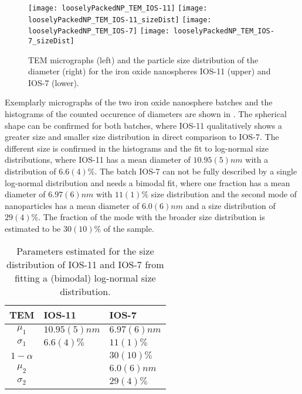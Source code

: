 \documentclass[\main/dresen_thesis.tex]{subfiles}
\begin{document}
  \label{sec:looselyPackedNS:nanoparticle:tem}
  \begin{figure}[!htbp]
    \centering
    \texttt{[image: looselyPackedNP\_TEM\_IOS-11]}
    \texttt{[image: looselyPackedNP\_TEM\_IOS-11\_sizeDist]}
    \texttt{[image: looselyPackedNP\_TEM\_IOS-7]}
    \texttt{[image: looselyPackedNP\_TEM\_IOS-7\_sizeDist]}
    \caption{\label{fig:looselyPackedNP:nanoparticle:tem}TEM micrographs (left) and the particle size distribution of the diameter (right) for the iron oxide nanospheres IOS-11 (upper) and IOS-7 (lower).}
  \end{figure}

  Exemplarly micrographs of the two iron oxide nanosphere batches and the histograms of the counted occurence of diameters are shown in .
  The spherical shape can be confirmed for both batches, where IOS-11 qualitatively shows a greater size and smaller size distribution in direct comparison to IOS-7.
  The different size is confirmed in the histograms and the fit to log-normal size distributions, where IOS-11 has a mean diameter of $10.95(5) \unit{nm}$ with a distribution of $6.6(4) \%$. 
  The batch IOS-7 can not be fully described by a single log-normal distribution and needs a bimodal fit, where one fraction has a mean diameter of $6.97(6) \unit{nm}$ with $11(1) \%$ size distribution and the second mode of nanoparticles has a mean diameter of $6.0(6) \unit{nm}$ and a size distribution of $29(4) \%$.
  The fraction of the mode with the broader size distribution is estimated to be $30(10) \%$ of the sample.

  \begin{table}[!htbp]
    \centering
    \caption{\label{tab:looselyPackedNP:nanoparticle:temModel}Parameters estimated for the size distribution of IOS-11 and IOS-7 from fitting a (bimodal) log-normal size distribution.}
    \begin{tabular}{ c | l | l }
      \textbf{TEM}  & IOS-11 & IOS-7 \\
      \hline
      $\mu_1$     & $10.95(5) \unit{nm}$  & $6.97(6) \unit{nm}$ \\
      $\sigma_1$  & $6.6(4) \unit{\%}$    & $11(1) \unit{\%}$ \\
      $1 - \alpha$&                       & $30(10)  \unit{\%}$   \\
      $\mu_2$     &                       & $6.0(6) \unit{nm}$ \\
      $\sigma_2$  &                       & $29(4) \unit{\%}$ \\
      \hline
    \end{tabular}
  \end{table}
\end{document}
